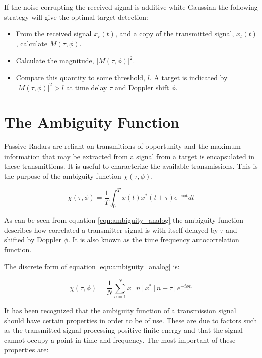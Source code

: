 \documentclass[a4paper]{report}
\numberwithin{equation}{chapter}
\begin{document}
\bigskip

If the noise corrupting the received signal is additive white Gaussian the following strategy will give the optimal target detection:

\begin{itemize}
\item{From the received signal $x_r(t)$, and a copy of the transmitted signal, $x_t(t)$, calculate $M(\tau, \phi)$.}
\item{Calculate the magnitude, $|M(\tau, \phi)|^2$.}
\item{Compare this quantity to some threshold, $l$. A target is indicated by $|M(\tau, \phi)|^2 > l$ at time delay $\tau$ and Doppler shift $\phi$.}
\end{itemize}

\section[The Ambiguity Function]{The Ambiguity Function}
Passive Radars are reliant on transmitions of opportunity and the maximum information that may be extracted from a signal from a target is encapsulated in these transmittions. It is useful to characterize the available transmissions. This is the purpose of the ambiguity function $\chi(\tau, \phi)$.

\begin{equation}
\chi(\tau, \phi) = \frac{1}{T} \int_0^T x(t)x^*(t + \tau)e^{-i\phi t}dt
\label{eqn:ambiguity_analog}
\end{equation}

As can be seen from equation \ref{eqn:ambiguity_analog} the ambiguity function describes how correlated a transmitter signal is with itself delayed by $\tau$ and shifted by Doppler $\phi$. It is also known as the time frequency autocorrelation function.

The discrete form of equation \ref{eqn:ambiguity_analog} is:

\begin{equation}
\chi(\tau, \phi) = \frac{1}{N} \sum_{n=1}^N x[n]x^*[n + \tau]e^{-i\phi n}
\label{eqn:ambiguity_discrete}
\end{equation}

It has been recognized that the ambiguity function of a transmission signal should have certain properties in order to be of use. These are due to factors such as the transmitted signal processing positive finite energy and that the signal cannot occupy a point in time and frequency. The most important of these properties are:
\end{document}
